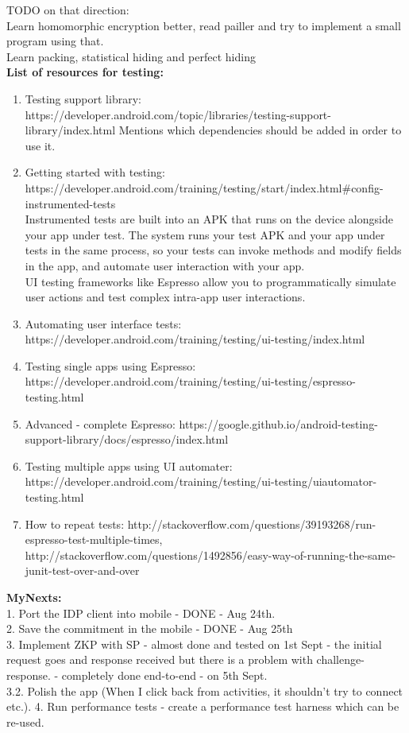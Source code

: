 \documentclass[11pt]{article}
\begin{document}
TODO on that direction:\\
Learn homomorphic encryption better, read pailler and try to implement a small program using that.\\
Learn packing, statistical hiding and perfect hiding\\

\textbf{List of resources for testing:}
\begin{enumerate}
 \item Testing support library: https://developer.android.com/topic/libraries/testing-support-library/index.html
 Mentions which dependencies should be added in order to use it.
 
 \item Getting started with testing: https://developer.android.com/training/testing/start/index.html#config-instrumented-tests\\
 
 Instrumented tests are built into an APK that runs on the device alongside your app under test. The system runs your test APK and your app under 
 tests in the same process, so your tests can invoke methods and modify fields in the app, and automate user interaction with your app.\\
 
 UI testing frameworks like Espresso allow you to programmatically simulate user actions and test complex intra-app user interactions.
 
 \item Automating user interface tests: https://developer.android.com/training/testing/ui-testing/index.html
 \item Testing single apps using Espresso: https://developer.android.com/training/testing/ui-testing/espresso-testing.html
 \item Advanced - complete Espresso: https://google.github.io/android-testing-support-library/docs/espresso/index.html
 \item Testing multiple apps using UI automater: https://developer.android.com/training/testing/ui-testing/uiautomator-testing.html
 \item How to repeat tests: http://stackoverflow.com/questions/39193268/run-espresso-test-multiple-times, 
http://stackoverflow.com/questions/1492856/easy-way-of-running-the-same-junit-test-over-and-over
\end{enumerate}



\textbf{MyNexts:}\\
 1. Port the IDP client into mobile - DONE - Aug 24th.\\
 2. Save the commitment in the mobile - DONE - Aug 25th\\
 3. Implement ZKP with SP - almost done and tested on 1st Sept - the initial request goes and response received but there is a problem with 
challenge-response. - completely done end-to-end - on 5th Sept.\\
3.2. Polish the app (When I click back from activities, it shouldn't try to connect etc.).
 4. Run performance tests - create a performance test harness which can be re-used.\\
\end{document}
